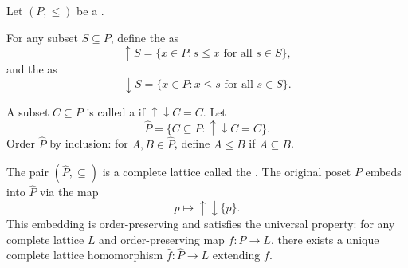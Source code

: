 \begin{definition} \label{definition:dedekind_MacNeille_completion_of_an_ordered_set}
Let $(P, \leq)$ be a .

For any subset $S \subseteq P$, define the  as
$$\uparrow S = \{x \in P : s \leq x \text{ for all } s \in S\},$$
and the  as
$$\downarrow S = \{x \in P : x \leq s \text{ for all } s \in S\}.$$

A subset $C \subseteq P$ is called a  if $\uparrow{\downarrow C} = C$. Let
$$\widehat{P} = \{C \subseteq P : \uparrow{\downarrow C} = C\}.$$
Order $\widehat{P}$ by inclusion: for $A, B \in \widehat{P}$, define $A \leq B$ if $A \subseteq B$.

The pair $(\widehat{P}, \subseteq)$ is a complete lattice called the . The original poset $P$ embeds into $\widehat{P}$ via the map
$$p \mapsto \uparrow{\downarrow \{p\}}.$$
This embedding is order-preserving and satisfies the universal property: for any complete lattice $L$ and order-preserving map $f : P \to L$, there exists a unique complete lattice homomorphism $\widehat{f} : \widehat{P} \to L$ extending $f$.
\end{definition}
